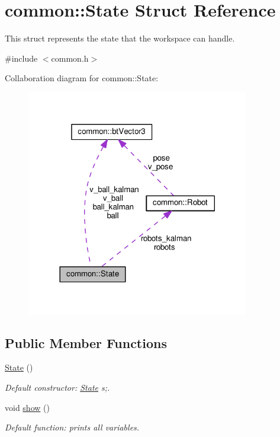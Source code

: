 \hypertarget{structcommon_1_1State}{}\section{common\+:\+:State Struct Reference}
\label{structcommon_1_1State}


This struct represents the state that the workspace can handle.  




{\ttfamily \#include $<$common.\+h$>$}



Collaboration diagram for common\+:\+:State\+:\nopagebreak
\begin{figure}[H]
\begin{center}
\leavevmode
\includegraphics[width=276pt]{structcommon_1_1State__coll__graph}
\end{center}
\end{figure}
\subsection*{Public Member Functions}
\begin{DoxyCompactItemize}
\item 
\hyperlink{structcommon_1_1State_ac8dcfb15646bb310c85161de2900c8c6}{State} ()\hypertarget{structcommon_1_1State_ac8dcfb15646bb310c85161de2900c8c6}{}\label{structcommon_1_1State_ac8dcfb15646bb310c85161de2900c8c6}

\begin{DoxyCompactList}\small\item\em Default constructor\+: \hyperlink{structcommon_1_1State}{State} s;. \end{DoxyCompactList}\item 
void \hyperlink{structcommon_1_1State_af0a474961bf0f3afe274ce27da0f28a3}{show} ()\hypertarget{structcommon_1_1State_af0a474961bf0f3afe274ce27da0f28a3}{}\label{structcommon_1_1State_af0a474961bf0f3afe274ce27da0f28a3}

\begin{DoxyCompactList}\small\item\em Default function\+: prints all variables. \end{DoxyCompactList}\end{DoxyCompactItemize}
